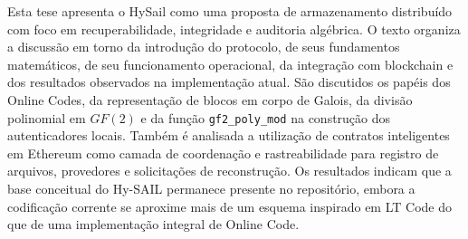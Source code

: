 Esta tese apresenta o HySail como uma proposta de armazenamento distribuído com foco em recuperabilidade, integridade e auditoria algébrica. O texto organiza a discussão em torno da introdução do protocolo, de seus fundamentos matemáticos, de seu funcionamento operacional, da integração com blockchain e dos resultados observados na implementação atual. São discutidos os papéis dos Online Codes, da representação de blocos em corpo de Galois, da divisão polinomial em $GF(2)$ e da função \texttt{gf2\_poly\_mod} na construção dos autenticadores locais. Também é analisada a utilização de contratos inteligentes em Ethereum como camada de coordenação e rastreabilidade para registro de arquivos, provedores e solicitações de reconstrução. Os resultados indicam que a base conceitual do Hy-SAIL permanece presente no repositório, embora a codificação corrente se aproxime mais de um esquema inspirado em LT Code do que de uma implementação integral de Online Code.
